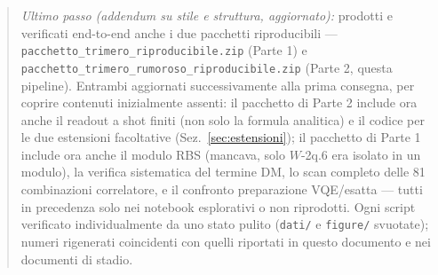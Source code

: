 \documentclass[11pt,a4paper]{article}
\begin{document}
\begin{quote}
\textit{Ultimo passo (addendum su stile e struttura, aggiornato):}
prodotti e verificati end-to-end anche i due pacchetti riproducibili ---
\texttt{pacchetto\_trimero\_\allowbreak riproducibile.zip} (Parte 1) e
\texttt{pacchetto\_trimero\_\allowbreak rumoroso\_\allowbreak riproducibile.zip}
(Parte 2, questa pipeline). Entrambi aggiornati successivamente alla
prima consegna, per coprire contenuti inizialmente assenti: il pacchetto
di Parte 2 include ora anche il readout a shot finiti (non solo la
formula analitica) e il codice per le due estensioni facoltative
(Sez.~\ref{sec:estensioni}); il pacchetto di Parte 1 include ora anche
il modulo RBS (mancava, solo $W$-2q.6 era isolato in un modulo), la
verifica sistematica del termine DM, lo scan completo delle 81
combinazioni correlatore, e il confronto preparazione VQE/esatta ---
tutti in precedenza solo nei notebook esplorativi o non riprodotti.
Ogni script verificato individualmente da uno stato pulito (\texttt{dati/}
e \texttt{figure/} svuotate); numeri rigenerati coincidenti con quelli
riportati in questo documento e nei documenti di stadio.
\end{quote}
\end{document}
